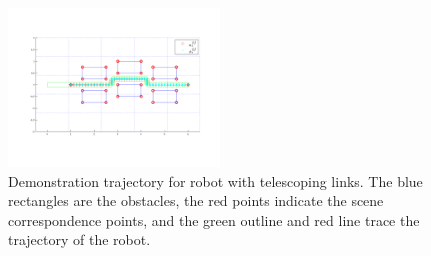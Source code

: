 \begin{figure}[h!]
\centering
\includegraphics[width=0.5\textwidth]{scopey_demo}
\vspace{-1cm}
\caption{Demonstration trajectory for robot with telescoping links. The blue rectangles are the obstacles, the red points indicate the scene correspondence points, and the green outline and red line trace the trajectory of the robot.}
\label{fig:scopey_demo}
\end{figure}

